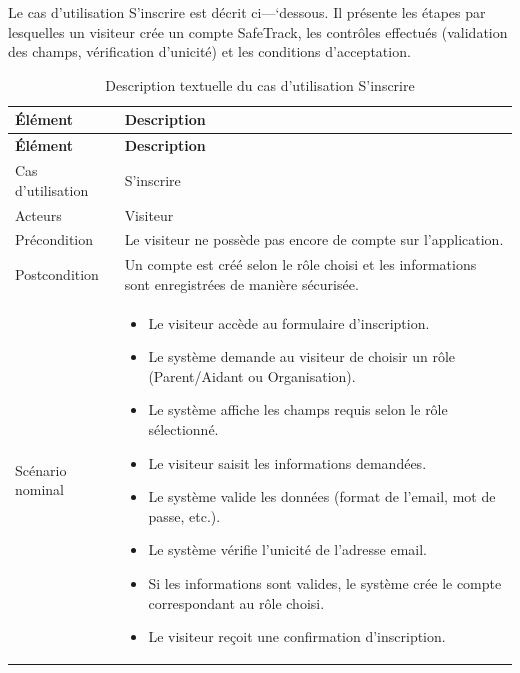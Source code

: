 Le cas d'utilisation \og S'inscrire \fg{} est décrit ci—‘dessous. Il présente les étapes par lesquelles un visiteur crée un compte SafeTrack, les contrôles effectués (validation des champs, vérification d'unicité) et les conditions d'acceptation.

\small
\renewcommand{\arraystretch}{1.1}
\setlength{\parskip}{0pt}
\begin{longtable}{|p{}|>{\raggedright\arraybackslash}p{}|}
\caption{Description textuelle du cas d'utilisation S'inscrire} \\ \hline
\textbf{Élément} & \textbf{Description} \\ \hline
\endfirsthead

\hline
\textbf{Élément} & \textbf{Description} \\ \hline
\endhead

\hline
\endlastfoot

Cas d'utilisation & S'inscrire \\ \hline

Acteurs & Visiteur \\ \hline

Précondition & Le visiteur ne possède pas encore de compte sur l'application. \\ \hline

Postcondition & Un compte est créé selon le rôle choisi et les informations sont enregistrées de manière sécurisée. \\ \hline

Scénario nominal &
\begin{itemize}[nosep, leftmargin=*]
\item Le visiteur accède au formulaire d'inscription.
\item Le système demande au visiteur de choisir un rôle (Parent/Aidant ou Organisation).
\item Le système affiche les champs requis selon le rôle sélectionné.
\item Le visiteur saisit les informations demandées.
\item Le système valide les données (format de l'email, mot de passe, etc.).
\item Le système vérifie l'unicité de l'adresse email.
\item Si les informations sont valides, le système crée le compte correspondant au rôle choisi.
\item Le visiteur reçoit une confirmation d'inscription.
\end{itemize}
\\ \hline

\end{longtable}


